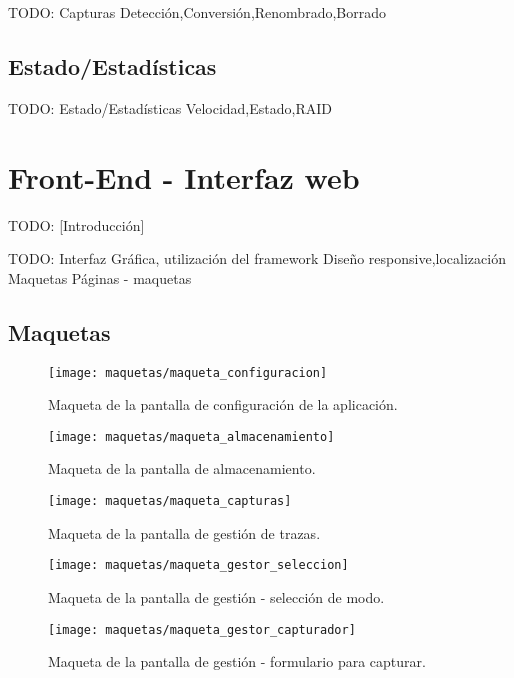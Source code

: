 TODO: Capturas
  {Detección,Conversión,Renombrado,Borrado}


\subsection{Estado/Estadísticas\label{ssec:dis:estado_estadisticas}}

TODO: Estado/Estadísticas
  {Velocidad,Estado,RAID}


\section{Front-End - Interfaz web\label{sec:dis:interfaz_web}}

TODO: [Introducción]

TODO: Interfaz Gráfica, utilización del framework
  {Diseño responsive,localización}
  {Maquetas}
  Páginas - maquetas

\subsection{Maquetas\label{ssec:dis:maquetas}}

\begin{figure}[!htp]
  \centering
  \texttt{[image: maquetas/maqueta\_configuracion]}
  \caption{Maqueta de la pantalla de configuración de la aplicación.}
  \label{fig:maqueta:configuracion}
\end{figure}

\begin{figure}[!htp]
  \centering
  \texttt{[image: maquetas/maqueta\_almacenamiento]}
  \caption{Maqueta de la pantalla de almacenamiento.}
  \label{fig:maqueta:almacenamiento}
\end{figure}

\begin{figure}[!htp]
  \centering
  \texttt{[image: maquetas/maqueta\_capturas]}
  \caption{Maqueta de la pantalla de gestión de \glspl{traza}.}
  \label{fig:maqueta:capturas}
\end{figure}

\begin{figure}[!htp]
  \centering
  \texttt{[image: maquetas/maqueta\_gestor\_seleccion]}
  \caption{Maqueta de la pantalla de gestión - selección de modo.}
  \label{fig:maqueta:gestor_seleccion}
\end{figure}

\begin{figure}[!htp]
  \centering
  \texttt{[image: maquetas/maqueta\_gestor\_capturador]}
  \caption{Maqueta de la pantalla de gestión - formulario para capturar.}
  \label{fig:maqueta:gestor_capturador}
\end{figure}

